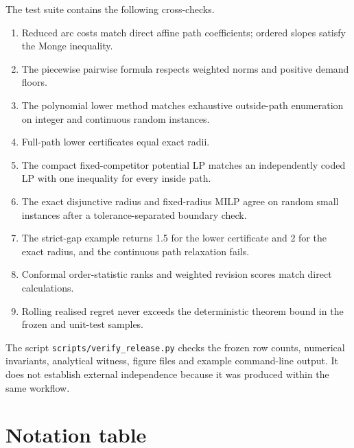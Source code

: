 \documentclass[11pt]{article}
\theoremstyle{definition}
\begin{document}
The test suite contains the following cross-checks.

\begin{enumerate}
\item Reduced arc costs match direct affine path coefficients; ordered slopes satisfy the Monge inequality.
\item The piecewise pairwise formula respects weighted norms and positive demand floors.
\item The polynomial lower method matches exhaustive outside-path enumeration on integer and continuous random instances.
\item Full-path lower certificates equal exact radii.
\item The compact fixed-competitor potential LP matches an independently coded LP with one inequality for every inside path.
\item The exact disjunctive radius and fixed-radius MILP agree on random small instances after a tolerance-separated boundary check.
\item The strict-gap example returns 1.5 for the lower certificate and 2 for the exact radius, and the continuous path relaxation fails.
\item Conformal order-statistic ranks and weighted revision scores match direct calculations.
\item Rolling realised regret never exceeds the deterministic theorem bound in the frozen and unit-test samples.
\end{enumerate}

The script \texttt{scripts/verify\_release.py} checks the frozen row counts, numerical invariants, analytical witness, figure files and example command-line output. It does not establish external independence because it was produced within the same workflow.

\section{Notation table}
\end{document}
